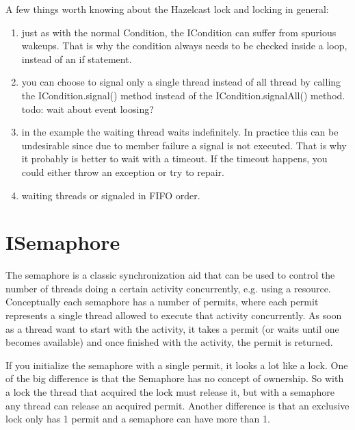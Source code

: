 A few things worth knowing about the Hazelcast lock and locking in general:
\begin{enumerate}
\item just as with the normal Condition, the ICondition can suffer from spurious wakeups. That is why the condition always needs to be checked inside a loop, instead of an if statement.
\item you can choose to signal only a single thread instead of all thread by calling the ICondition.signal() method instead of the ICondition.signalAll() method. todo: wait about event loosing?
\item in the example the waiting thread waits indefinitely. In practice this can be undesirable since due to member failure a signal is not executed. That is why it probably is better to wait with a timeout. If the timeout happens, you could either throw an exception or try to repair.
\item waiting threads or signaled in FIFO order.
\end{enumerate}

\section{ISemaphore}
The semaphore is a classic synchronization aid that can be used to control the number of threads doing a certain activity concurrently, e.g. using a resource. Conceptually each semaphore has a number of permits, where each permit represents a single thread allowed to execute that activity concurrently. As soon as a thread want to start with the activity, it takes a permit (or waits until one becomes available) and once finished with the activity, the permit is returned.

If you initialize the semaphore with a single permit, it looks a lot like a lock. One of the big difference is that the Semaphore has no concept of ownership. So with a lock the thread that acquired the lock must release it, but with a semaphore any thread can release an acquired permit. Another difference is that an exclusive lock only has 1 permit and a semaphore can have more than 1.

